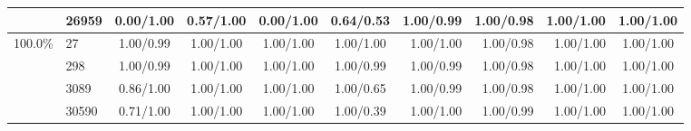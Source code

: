 \documentclass{bmcart}
\begin{document}
\begin{table}[htbp]
\begin{tabular}{rrrrrrrrrr}
    \multicolumn{1}{c}{} & \multicolumn{1}{l}{26959} & \multicolumn{1}{c}{0.00/1.00} & \multicolumn{1}{c}{0.57/1.00} & \multicolumn{1}{c}{0.00/1.00} & \multicolumn{1}{c}{0.64/0.53} & 1.00/0.99 & 1.00/0.98 & 1.00/1.00 & \multicolumn{1}{c}{1.00/1.00} \\
    \midrule
    \multicolumn{1}{c}{100.0\%} & \multicolumn{1}{l}{27} & \multicolumn{1}{c}{1.00/0.99} & \multicolumn{1}{c}{1.00/1.00} & \multicolumn{1}{c}{1.00/1.00} & \multicolumn{1}{c}{1.00/1.00} & 1.00/1.00 & 1.00/0.98 & 1.00/1.00 & \multicolumn{1}{c}{1.00/1.00} \\
    \multicolumn{1}{c}{} & \multicolumn{1}{l}{298} & \multicolumn{1}{c}{1.00/0.99} & \multicolumn{1}{c}{1.00/1.00} & \multicolumn{1}{c}{1.00/1.00} & \multicolumn{1}{c}{1.00/0.99} & 1.00/0.99 & 1.00/0.98 & 1.00/1.00 & \multicolumn{1}{c}{1.00/1.00} \\
    \multicolumn{1}{c}{} & \multicolumn{1}{l}{3089} & \multicolumn{1}{c}{0.86/1.00} & \multicolumn{1}{c}{1.00/1.00} & \multicolumn{1}{c}{1.00/1.00} & \multicolumn{1}{c}{1.00/0.65} & 1.00/0.99 & 1.00/0.98 & 1.00/1.00 & \multicolumn{1}{c}{1.00/1.00} \\
    \multicolumn{1}{c}{} & \multicolumn{1}{l}{30590} & \multicolumn{1}{c}{0.71/1.00} & \multicolumn{1}{c}{1.00/1.00} & \multicolumn{1}{c}{1.00/1.00} & \multicolumn{1}{c}{1.00/0.39} & 1.00/1.00 & 1.00/0.99 & 1.00/1.00 & \multicolumn{1}{c}{1.00/1.00} \\
    \bottomrule
    \end{tabular}%
\end{table}%
\end{document}
